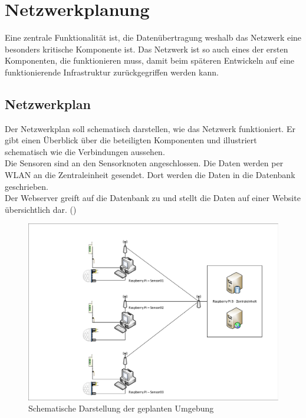 \section{Netzwerkplanung}
Eine zentrale Funktionalität ist, die Datenübertragung weshalb das Netzwerk eine besonders kritische Komponente ist. Das Netzwerk ist so auch eines der ersten Komponenten, die funktionieren muss, damit beim späteren Entwickeln auf eine funktionierende Infrastruktur zurückgegriffen werden kann.

\subsection{Netzwerkplan}
Der Netzwerkplan soll schematisch darstellen, wie das Netzwerk funktioniert. Er gibt einen Überblick über die beteiligten Komponenten und illustriert schematisch wie die Verbindungen aussehen.\\
Die Sensoren sind an den Sensorknoten angeschlossen. Die Daten werden per WLAN
an die Zentraleinheit gesendet. Dort werden die Daten in die Datenbank
geschrieben.\\
Der Webserver greift auf die Datenbank zu und stellt die Daten auf einer Website
übersichtlich dar. ()
\begin{figure} [htb]
\begin{centering}
\includegraphics[scale=0.4]{Bilder/Kapitel3/Netzplan.pdf}
\caption[Schematische Darstellung der geplanten Umgebung]{Schematische
Darstellung der geplanten Umgebung}
\label{Darstellung_Umgebung}
\end{centering}
\end{figure} 

